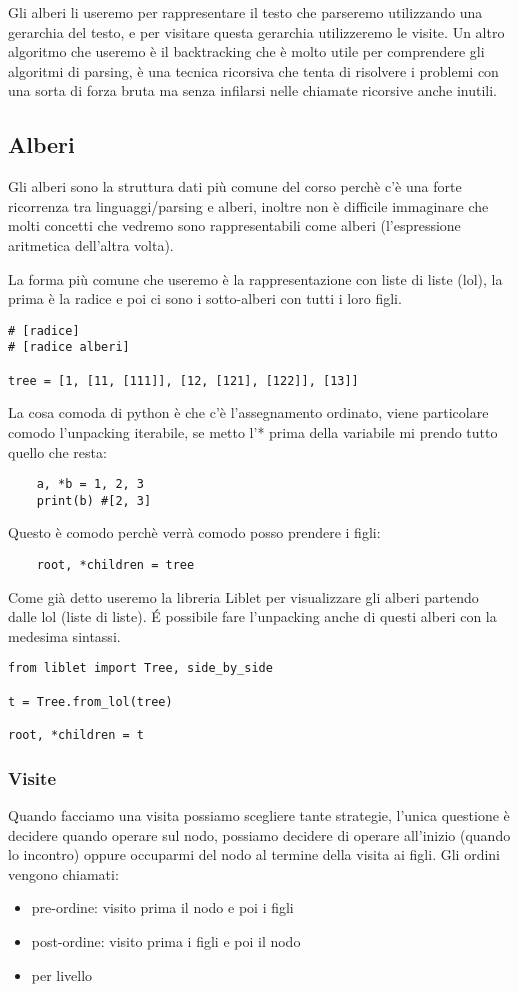 Gli alberi li useremo per rappresentare il testo che parseremo utilizzando una gerarchia del testo, e per visitare questa gerarchia utilizzeremo le visite.
Un altro algoritmo che useremo è il backtracking che è molto utile per comprendere gli algoritmi di parsing, è una tecnica ricorsiva che tenta di risolvere i problemi con una sorta di forza bruta ma senza infilarsi nelle chiamate ricorsive anche inutili.

\subsection{Alberi}
Gli alberi sono la struttura dati più comune del corso perchè c'è una forte ricorrenza tra linguaggi/parsing e alberi, inoltre non è difficile immaginare che molti concetti che vedremo sono rappresentabili come alberi (l'espressione aritmetica dell'altra volta).

La forma più comune che useremo è la rappresentazione con liste di liste (lol), la prima è la radice e poi ci sono i sotto-alberi con tutti i loro figli.
\begin{lstlisting} 
# [radice] 
# [radice alberi]

tree = [1, [11, [111]], [12, [121], [122]], [13]]
\end{lstlisting}

La cosa comoda di python è che c'è l'assegnamento ordinato, viene particolare comodo l'unpacking iterabile, se metto l'* prima della variabile mi prendo tutto quello che resta:
\begin{lstlisting}
    a, *b = 1, 2, 3
    print(b) #[2, 3]
\end{lstlisting}

Questo è comodo perchè verrà comodo posso prendere i figli:
\begin{lstlisting}
    root, *children = tree
\end{lstlisting}

Come già detto useremo la libreria Liblet per visualizzare gli alberi partendo dalle lol (liste di liste).
\'E possibile fare l'unpacking anche di questi alberi con la medesima sintassi.
\begin{lstlisting} 
from liblet import Tree, side_by_side

t = Tree.from_lol(tree)

root, *children = t
\end{lstlisting}

\subsubsection{Visite}
Quando facciamo una visita possiamo scegliere tante strategie, l'unica questione è decidere quando operare sul nodo, possiamo decidere di operare all'inizio (quando lo incontro) oppure occuparmi del nodo al termine della visita ai figli. Gli ordini vengono chiamati:
\begin{itemize}
    \item pre-ordine: visito prima il nodo e poi i figli
    \item post-ordine: visito prima i figli e poi il nodo
    \item per livello
\end{itemize}

